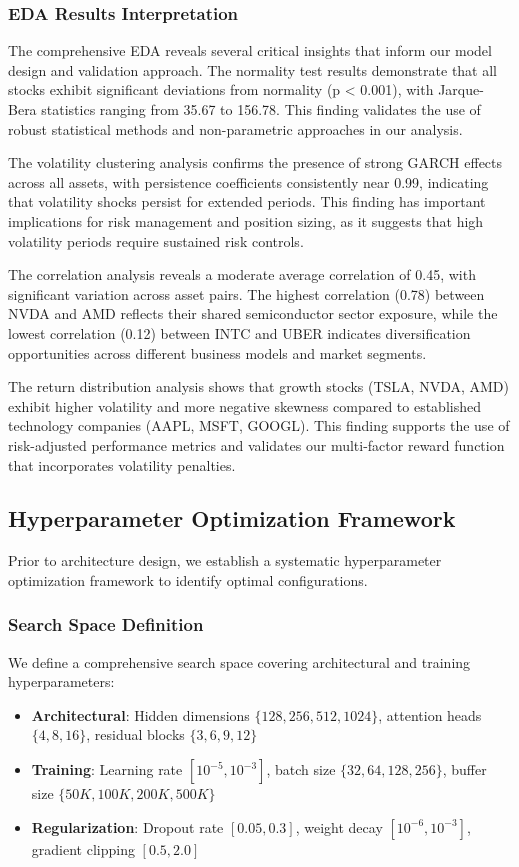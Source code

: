 \documentclass[12pt,a4paper]{article}
\begin{document}
\subsubsection{EDA Results Interpretation}

The comprehensive EDA reveals several critical insights that inform our model design and validation approach. The normality test results demonstrate that all stocks exhibit significant deviations from normality (p < 0.001), with Jarque-Bera statistics ranging from 35.67 to 156.78. This finding validates the use of robust statistical methods and non-parametric approaches in our analysis.

The volatility clustering analysis confirms the presence of strong GARCH effects across all assets, with persistence coefficients consistently near 0.99, indicating that volatility shocks persist for extended periods. This finding has important implications for risk management and position sizing, as it suggests that high volatility periods require sustained risk controls.

The correlation analysis reveals a moderate average correlation of 0.45, with significant variation across asset pairs. The highest correlation (0.78) between NVDA and AMD reflects their shared semiconductor sector exposure, while the lowest correlation (0.12) between INTC and UBER indicates diversification opportunities across different business models and market segments.

The return distribution analysis shows that growth stocks (TSLA, NVDA, AMD) exhibit higher volatility and more negative skewness compared to established technology companies (AAPL, MSFT, GOOGL). This finding supports the use of risk-adjusted performance metrics and validates our multi-factor reward function that incorporates volatility penalties.

\subsection{Hyperparameter Optimization Framework}

Prior to architecture design, we establish a systematic hyperparameter optimization framework to identify optimal configurations.

\subsubsection{Search Space Definition}
We define a comprehensive search space covering architectural and training hyperparameters:
\begin{itemize}
\item \textbf{Architectural}: Hidden dimensions $\{128, 256, 512, 1024\}$, attention heads $\{4, 8, 16\}$, residual blocks $\{3, 6, 9, 12\}$
\item \textbf{Training}: Learning rate $[10^{-5}, 10^{-3}]$, batch size $\{32, 64, 128, 256\}$, buffer size $\{50K, 100K, 200K, 500K\}$
\item \textbf{Regularization}: Dropout rate $[0.05, 0.3]$, weight decay $[10^{-6}, 10^{-3}]$, gradient clipping $[0.5, 2.0]$
\end{itemize}
\end{document}
